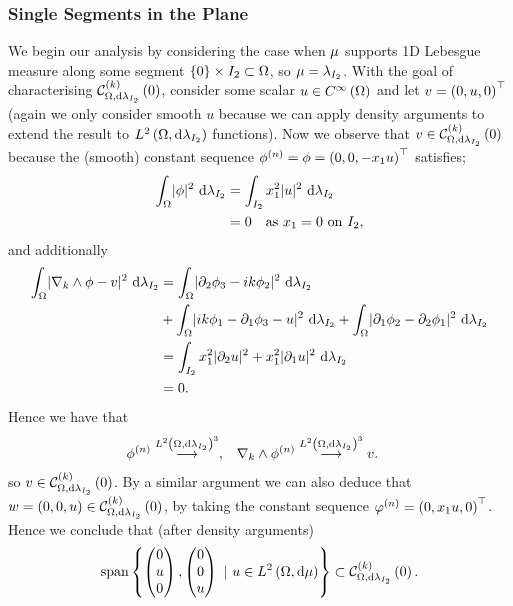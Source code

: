 \subsubsection{Single Segments in the Plane}
We begin our analysis by considering the case when $\mu$ supports 1D Lebesgue measure along some segment $\left\{ 0 \right\}\times I_2\subset\Omega$, so $\mu=\lambda_{I_2}$.
With the goal of characterising $\mathcal{C}_{ \Omega, \mathrm{d}\lambda_{I_2}}^{(k)}\left( 0 \right)$, consider some scalar $u\in C^{\infty}\left( \Omega \right)$ and let $v = \left( 0,u,0 \right)^{\top}$ (again we only consider smooth $u$ because we can apply density arguments to extend the result to $L^{2}\left( \Omega,\mathrm{d}\lambda_{I_2} \right)$ functions).
Now we observe that $v\in\mathcal{C}_{ \Omega, \mathrm{d}\lambda_{I_2}}^{(k)}\left( 0 \right)$ because the (smooth) constant sequence $\phi^{(n)} = \phi = \left( 0,0,-x_1 u \right)^{\top}$ satisfies;
\begin{align*}
	\int_{\Omega}\lvert \phi \rvert^2 \ \mathrm{d}\lambda_{I_2} &= \int_{I_2}x_1^2\lvert u \rvert^2 \ \mathrm{d}\lambda_{I_2} \\
	&= 0 \quad\text{as } x_1 = 0 \text{ on } I_2,
\end{align*}
and additionally
\begin{align*}
	\int_{\Omega}\lvert \nabla_{k}\wedge\phi - v \rvert^2 \ \mathrm{d}\lambda_{I_2} &= \int_{\Omega}\lvert \partial_2\phi_3 - ik\phi_2 \rvert^2 \ \mathrm{d}\lambda_{I_2} \\
	&+ \int_{\Omega}\lvert ik\phi_1 - \partial_1\phi_3 - u \rvert^2 \ \mathrm{d}\lambda_{I_2} + \int_{\Omega}\lvert \partial_1\phi_2 - \partial_2\phi_1 \rvert^2 \ \mathrm{d}\lambda_{I_2} \\
	&= \int_{I_2}x_1^2\lvert \partial_2 u \rvert^2 + x_1^2\lvert \partial_1 u \rvert^2 \ \mathrm{d}\lambda_{I_2} \\
	&= 0.
\end{align*}
Hence we have that
\begin{align} \label{eq:Curl0SeqConv}
	\phi^{(n)} \overset{L^{2}\left( \Omega,\mathrm{d}\lambda_{I_2} \right)^3}{\longrightarrow},
	&\quad \nabla_{k}\wedge\phi^{(n)} \overset{L^{2}\left( \Omega,\mathrm{d}\lambda_{I_2} \right)^3}{\longrightarrow} v.
\end{align}
so $v\in\mathcal{C}_{ \Omega, \mathrm{d}\lambda_{I_2}}^{(k)}\left( 0 \right)$.
By a similar argument we can also deduce that $w=\left( 0,0,u \right)\in\mathcal{C}_{ \Omega, \mathrm{d}\lambda_{I_2}}^{(k)}\left( 0 \right)$, by taking the constant sequence $\varphi^{(n)}=\left( 0,x_1 u,0 \right)^{\top}$.
Hence we conclude that (after density arguments)
\begin{align*}
	\mathrm{span}\clbracs{\begin{pmatrix} 0 \\ u \\ 0 \end{pmatrix}, \begin{pmatrix} 0 \\ 0 \\ u \end{pmatrix} \ \vert \ u\in\ltwo{\ddom}{\ddmes}} \subset \kcurlZero{\ddom}{\lambda_{I_2}}.
\end{align*}
